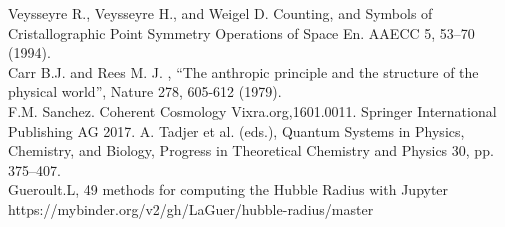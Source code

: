 \documentclass[a4paper,9pt]{article}
\begin{document}
\begin{thebibliography}{99}
 Veysseyre R., Veysseyre H., and Weigel D. Counting, and Symbols of Cristallographic Point Symmetry Operations of Space En. AAECC 5, 53--70 (1994).\\
 Carr B.J. and Rees M. J. , “The anthropic principle and the structure of the physical world”, Nature 278, 605-612 (1979).\\
 F.M. Sanchez. Coherent Cosmology Vixra.org,1601.0011. Springer International Publishing AG 2017. A. Tadjer et al. (eds.), Quantum Systems in Physics, Chemistry, and Biology, Progress in Theoretical Chemistry and Physics 30, pp. 375--407. \\ 
 Gueroult.L, 49 methods for computing the Hubble Radius with Jupyter https://mybinder.org/v2/gh/LaGuer/hubble-radius/master \\ 
\end{thebibliography}
\end{document}
